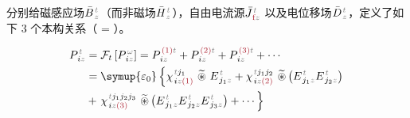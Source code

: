 分别给磁感应场$\bar{B}^{\;\!\mathcolor{gray}{t}}_{\;\!\mathcolor{gray}{z}}$（而非磁场$\bar{H}^{\;\!\mathcolor{gray}{t}}_{\;\!\mathcolor{gray}{z}}$），自由电流源$\bar{J}^{\;\!\mathcolor{gray}{t}}_{\;\!\textcolor{Maroon}{\text{f}}\mathcolor{gray}{z}}$ 以及电位移场$\bar{D}^{\;\!\mathcolor{gray}{t}}_{\;\!\mathcolor{gray}{z}}$，定义了如下 3 个本构关系（\textcolor{Maroon}{} = \textcolor{Maroon}{}）。

\begin{subequations} \label{P_z_nonlinear}
\begin{align}
	P^{\;\!\mathcolor{gray}{t}}_{\;\! i\mathcolor{gray}{z}} &= \mathcal F_t \left[ P^{\;\! \mathcolor{gray}{\omega}}_{\;\! i\mathcolor{gray}{z}} \right] = P^{\;\! \textcolor{Maroon}{(1)} \mathcolor{gray}{t}}_{\;\! i\mathcolor{gray}{z}} + P^{\;\! \textcolor{Maroon}{(2)} \mathcolor{gray}{t}}_{\;\! i\mathcolor{gray}{z}} + P^{\;\! \textcolor{Maroon}{(3)} \mathcolor{gray}{t}}_{\;\! i\mathcolor{gray}{z}} + \cdots \\ &= {\symup{\varepsilon_0}} \left\{ \chi^{\;\! \mathcolor{gray}{t} j_1}_{\;\! i \mathcolor{gray}{z} \textcolor{Maroon}{(1)}} ~\widetilde \circledast~ E^{\;\!\mathcolor{gray}{t}}_{\;\! j_1 \mathcolor{gray}{z}} + \chi^{\;\! \mathcolor{gray}{t} j_1 j_2}_{\;\! i \mathcolor{gray}{z} \textcolor{Maroon}{(2)}}~\widetilde \circledast\left( E^{\;\!\mathcolor{gray}{t}}_{\;\! j_1 \mathcolor{gray}{z}} E^{\;\!\mathcolor{gray}{t}}_{\;\! j_2 \mathcolor{gray}{z}} \right) \right. \\ &+ \left. \chi^{\;\! \mathcolor{gray}{t} j_1 j_2 j_3}_{\;\! i \mathcolor{gray}{z} \textcolor{Maroon}{(3)}}~\widetilde \circledast\left( E^{\;\!\mathcolor{gray}{t}}_{\;\! j_1 \mathcolor{gray}{z}} E^{\;\!\mathcolor{gray}{t}}_{\;\! j_2 \mathcolor{gray}{z}} E^{\;\!\mathcolor{gray}{t}}_{\;\! j_3 \mathcolor{gray}{z}} \right) + \cdots \right\}
\end{align}
\end{subequations}

